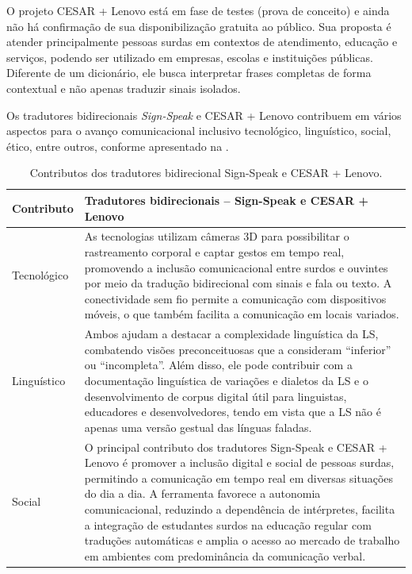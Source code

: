\documentclass[portuguese]{textolivre}
\begin{document}
O projeto CESAR + Lenovo está em fase de testes (prova de conceito) e ainda não há confirmação de sua disponibilização gratuita ao público. Sua proposta é atender principalmente pessoas surdas em contextos de atendimento, educação e serviços, podendo ser utilizado em empresas, escolas e instituições públicas. Diferente de um dicionário, ele busca interpretar frases completas de forma contextual e não apenas traduzir sinais isolados.

Os tradutores bidirecionais \textit{Sign-Speak} e CESAR + Lenovo contribuem em vários aspectos para o avanço comunicacional inclusivo tecnológico, linguístico, social, ético, entre outros, conforme apresentado na .

\begin{table}[htbp]
\centering
\small
\caption{Contributos dos tradutores bidirecional Sign-Speak e CESAR + Lenovo.}
\label{tab5}
\begin{tabularx}{\textwidth}{>{\raggedright\arraybackslash}p{}
                              >{\raggedright\arraybackslash}X}
\toprule
Contributo & Tradutores bidirecionais – Sign-Speak e CESAR + Lenovo \\
\midrule

Tecnológico &
As tecnologias utilizam câmeras 3D para possibilitar o rastreamento corporal e captar gestos em tempo real, promovendo a inclusão comunicacional entre surdos e ouvintes por meio da tradução bidirecional com sinais e fala ou texto. A conectividade sem fio permite a comunicação com dispositivos móveis, o que também facilita a comunicação em locais variados.
\\[0.5em]

Linguístico &
Ambos ajudam a destacar a complexidade linguística da LS, combatendo visões preconceituosas que a consideram “inferior” ou “incompleta”. Além disso, ele pode contribuir com a documentação linguística de variações e dialetos da LS e o desenvolvimento de corpus digital útil para linguistas, educadores e desenvolvedores, tendo em vista que a LS não é apenas uma versão gestual das línguas faladas.
\\[0.5em]

Social &
O principal contributo dos tradutores Sign-Speak e CESAR + Lenovo é promover a inclusão digital e social de pessoas surdas, permitindo a comunicação em tempo real em diversas situações do dia a dia. A ferramenta favorece a autonomia comunicacional, reduzindo a dependência de intérpretes, facilita a integração de estudantes surdos na educação regular com traduções automáticas e amplia o acesso ao mercado de trabalho em ambientes com predominância da comunicação verbal.
\\[0.5em]


\end{tabularx}
\end{table}
\end{document}
